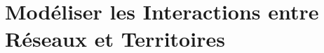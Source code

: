 

\chapter{Modéliser les Interactions entre Réseaux et Territoires}


\label{ch:modelinginteractions} %





